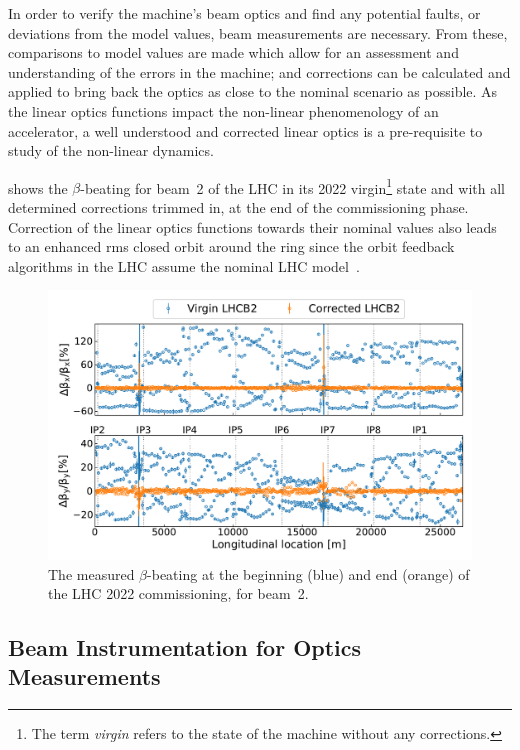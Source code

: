 In order to verify the machine's beam optics and find any potential faults, or deviations from the model values, beam measurements are necessary.
From these, comparisons to model values are made which allow for an assessment and understanding of the errors in the machine; and corrections can be calculated and applied to bring back the optics as close to the nominal scenario as possible.
As the linear optics functions impact the non-linear phenomenology of an accelerator, a well understood and corrected linear optics is a pre-requisite to study of the non-linear dynamics.

 shows the \(\beta\)-beating for beam~\num{2} of the LHC in its \num{2022} virgin\footnote{The term \textit{virgin} refers to the state of the machine without any corrections.} state and with all determined corrections trimmed in, at the end of the commissioning phase.
Correction of the linear optics functions towards their nominal values also leads to an enhanced rms closed orbit around the ring since the orbit feedback algorithms in the LHC assume the nominal LHC model~\cite{PRAB:Tomas:Record_Low_Beta_Beating_in_the_LHC, PRAB:Persson:LHC_Optics_Commissioning_OnePercent}.

\begin{figure}[!hbt]
  \centering
  \includegraphics*[width=0.9\linewidth]{Figures/Optics_Measurements_Corrections_at_LHC/virgin_vs_commissionned_lhcb2.pdf}
  \caption{The measured \(\beta\)-beating at the beginning (\textcolor{mplblue}{blue}) and end (\textcolor{mplorange}{orange}) of the LHC \num{2022} commissioning, for beam~\num{2}.}
  \label{figure:virgin_vs_corrected_lhcb2}
\end{figure}

\subsection{Beam Instrumentation for Optics Measurements}
\label{subsection:beam_instrumentation_for_optics_measurements}

